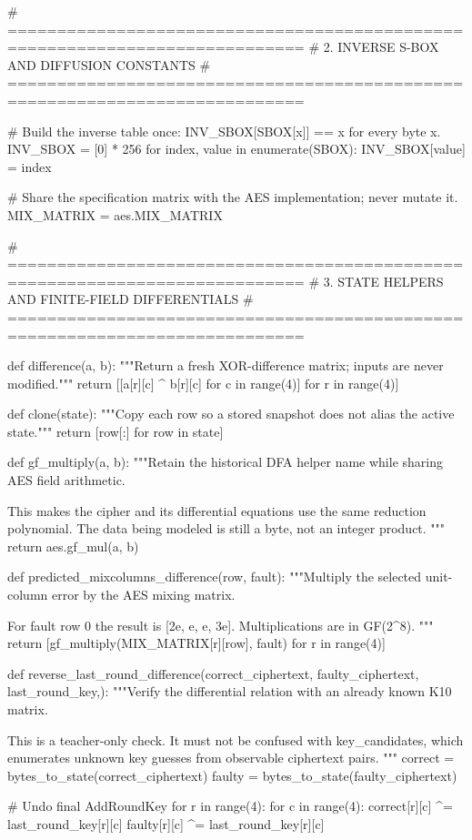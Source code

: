 \begin{lightcode}[numbers=left,firstnumber=1]
# ============================================================================
# 2. INVERSE S-BOX AND DIFFUSION CONSTANTS
# ============================================================================


# Build the inverse table once: INV_SBOX[SBOX[x]] == x for every byte x.
INV_SBOX = [0] * 256
for index, value in enumerate(SBOX):
    INV_SBOX[value] = index

# Share the specification matrix with the AES implementation; never mutate it.
MIX_MATRIX = aes.MIX_MATRIX


# ============================================================================
# 3. STATE HELPERS AND FINITE-FIELD DIFFERENTIALS
# ============================================================================


def difference(a, b):
    """Return a fresh XOR-difference matrix; inputs are never modified."""
    return [[a[r][c] ^ b[r][c] for c in range(4)] for r in range(4)]


def clone(state):
    """Copy each row so a stored snapshot does not alias the active state."""
    return [row[:] for row in state]


def gf_multiply(a, b):
    """Retain the historical DFA helper name while sharing AES field arithmetic.

    This makes the cipher and its differential equations use the same reduction
    polynomial. The data being modeled is still a byte, not an integer product.
    """
    return aes.gf_mul(a, b)


def predicted_mixcolumns_difference(row, fault):
    """Multiply the selected unit-column error by the AES mixing matrix.

    For fault row 0 the result is [2e, e, e, 3e]. Multiplications are in GF(2^8).
    """
    return [gf_multiply(MIX_MATRIX[r][row], fault) for r in range(4)]


def reverse_last_round_difference(correct_ciphertext, faulty_ciphertext, last_round_key,):
    """Verify the differential relation with an already known K10 matrix.

    This is a teacher-only check. It must not be confused with key_candidates,
    which enumerates unknown key guesses from observable ciphertext pairs.
    """
    correct = bytes_to_state(correct_ciphertext)
    faulty = bytes_to_state(faulty_ciphertext)

    # Undo final AddRoundKey
    for r in range(4):
        for c in range(4):
            correct[r][c] ^= last_round_key[r][c]
            faulty[r][c] ^= last_round_key[r][c]


\end{lightcode}
